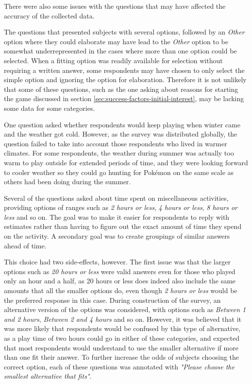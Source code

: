 There were also some issues with the questions that may have affected the accuracy of the collected data.

The questions that presented subjects with several options, followed by an \emph{Other} option where they could elaborate may have lead to the \emph{Other} option to be somewhat underrepresented in the cases where more than one option could be selected. When a fitting option was readily available for selection without requiring a written answer, some respondents may have chosen to only select the simple option and ignoring the option for elaboration. Therefore it is not unlikely that some of these questions, such as the one asking about reasons for starting the game discussed in section \ref{sec:success-factors-initial-interest}, may be lacking some data for some categories.

One question asked whether respondents would keep playing when winter came and the weather got cold. However, as the survey was distributed globally, the question failed to take into account those respondents who lived in warmer climates. For some respondents, the weather during summer was actually too warm to play outside for extended periods of time, and they were looking forward to cooler weather so they could go hunting for Pokémon on the same scale as others had been doing during the summer.

Several of the questions asked about time spent on miscellaneous activities, providing options of ranges such as \emph{2 hours or less}, \emph{4 hours or less}, \emph{8 hours or less} and so on. The goal was to make it easier for respondents to reply with estimates rather than having to figure out the exact amount of time they spend on the activity. A secondary goal was to create groupings of similar answers ahead of time.

This choice had two side-effects, however. The first issue was that the larger options such as \emph{20 hours or less} were valid answers even for those who played only an hour and a half, as 20 hours or less does indeed also include the same amounts that all the smaller options do, even though \emph{2 hours or less} would be the preferred response in this case. During construction of the survey, an alternative version of the options was considered, with options such as \emph{Between 1 and 2 hours}, \emph{Between 2 and 4 hours} and so on. However, it was believed that it was more likely that respondents would be confused by this type of alternative, as a play time of two hours could go in either of these categories, and expected that most respondents would understand to use the smaller alternative if more than one fit their answer. To further increase the odds of subjects choosing the correct option, each of these questions was annotated with \emph{"Please choose the smallest alternative that fits"}.

